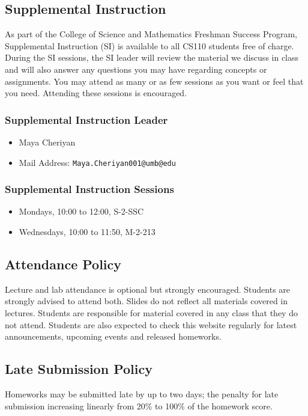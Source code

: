 \documentclass[12pt,letterpaper,twoside]{article}
\begin{document}
\subsection*{Supplemental Instruction}
As part of the College of Science and Mathematics Freshman Success Program, Supplemental Instruction (SI) is available to all CS110 students free of charge. During the SI sessions, the SI leader will review the material we discuss in class and will also answer any questions you may have regarding concepts or assignments. You may attend as many or as few sessions as you want or feel that you need. Attending these sessions is encouraged.

\subsubsection*{Supplemental Instruction Leader}
\begin{itemize}
\item[] Maya Cheriyan
\item[] Mail Address: \texttt{Maya.Cheriyan001@umb@edu}
\end{itemize}

\subsubsection*{Supplemental Instruction Sessions}
\begin{itemize}
\item[] Mondays, 10:00 to 12:00, S-2-SSC
\item[] Wednesdays, 10:00 to 11:50, M-2-213
\end{itemize}


\subsection*{Attendance Policy}
Lecture and lab attendance is optional but strongly encouraged. Students are strongly advised to attend both. Slides do not reﬂect all materials covered in lectures. Students are responsible for material covered in any class that they do not attend. Students are also expected to check this website regularly for latest announcements, upcoming events and released homeworks.

\subsection*{Late Submission Policy}
Homeworks may be submitted late by up to two days; the penalty for late submission increasing linearly from 20\% to 100\% of the homework score.
\end{document}
